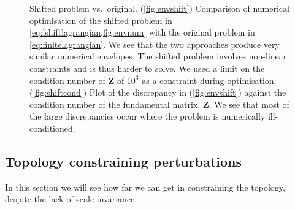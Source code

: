 \documentclass[12pt]{article}
\newcommand{\fundm}{Z}
\newcommand{\fund}{\mathbf{\fundm}}
\begin{document}
\begin{figure}[ht]
\begin{center}
\begin{myenuma}
  \item {}
  \label{fig:envshift}
  \item {}
  \label{fig:shiftcond}
\end{myenuma}
\caption[Shifted problem vs.\ original]{Shifted problem vs.\ original.
(\ref*{fig:envshift}) Comparison of numerical optimisation of the shifted problem in \cref{eq:lshiftlagrangian,fig:envnum} with the original problem in \cref{eq:finitelagrangian}.
We see that the two approaches produce very similar numerical envelopes.
The shifted problem involves non-linear constraints and is thus harder to solve.
We used a limit on the condition number of \(\fund\) of \(10^3\) as a constraint during optimisation.
(\ref*{fig:shiftcond}) Plot of the discrepancy in (\ref*{fig:envshift}) against the condition number of the fundamental matrix, \(\fund \).
We see that most of the large discrepancies occur where the problem is numerically ill-conditioned.
\label{fig:shifted}}
\end{center}
\end{figure}


\subsection{Topology constraining perturbations}\label{sec:topology}

In this section we will see how far we can get in constraining the topology, 
despite the lack of scale invariance.
\end{document}
